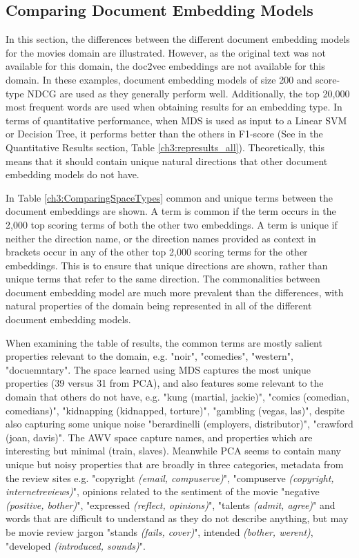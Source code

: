 \subsection{Comparing Document Embedding Models}

In this section, the differences between the different document embedding models for the movies domain are illustrated.  However, as the original text was not available for this domain, the  doc2vec embeddings are not available for this domain. In these examples, document embedding models of size 200 and score-type NDCG are used as they generally perform well. Additionally, the top 20,000 most frequent words are used when obtaining results for an embedding type. In terms of quantitative performance,  when MDS is used as input to a Linear SVM or Decision Tree, it performs better than the others in F1-score (See in the Quantitative Results section, Table \ref{ch3:represults_all}). Theoretically, this means that it should contain unique natural directions that other document embedding models do not have. 

In Table \ref{ch3:ComparingSpaceTypes} common and unique terms between the document embeddings are shown. A term  is  common if the term occurs in the 2,000 top scoring terms of both the other two embeddings. A term is unique  if neither the direction name, or the direction names provided as context in brackets occur in any of the other top 2,000 scoring terms for the other embeddings. This is to ensure that unique directions are shown, rather than unique terms that refer to the same direction. The commonalities between document embedding model are much more prevalent than the differences, with natural properties of the domain being represented in all of the different document embedding models. 

When examining the table of results, the common terms are mostly salient properties relevant to the domain, e.g. "noir", "comedies", "western", "docuemntary". The space learned using MDS captures  the most unique  properties (39 versus 31 from PCA), and also features some relevant to the domain that others do not have, e.g. "kung (martial, jackie)", "comics (comedian, comedians)", "kidnapping (kidnapped, torture)", "gambling (vegas, las)", despite also capturing some unique noise "berardinelli (employers, distributor)", "crawford (joan, davis)". The AWV space capture names, and properties which are interesting but minimal (train, slaves). Meanwhile PCA seems to contain many unique but noisy properties  that are broadly in three categories, metadata from the review sites e.g. "copyright \textit{(email, compuserve)}", "compuserve \textit{(copyright, internetreviews)}", opinions related  to the sentiment of the movie  "negative \textit{(positive, bother)}", "expressed \textit{(reflect, opinions)}", "talents \textit{(admit, agree)}" and words that are difficult to understand as they do not describe anything, but may be movie review jargon "stands \textit{(fails, cover)}", intended \textit{(bother, werent)}, "developed \textit{(introduced, sounds)}".

